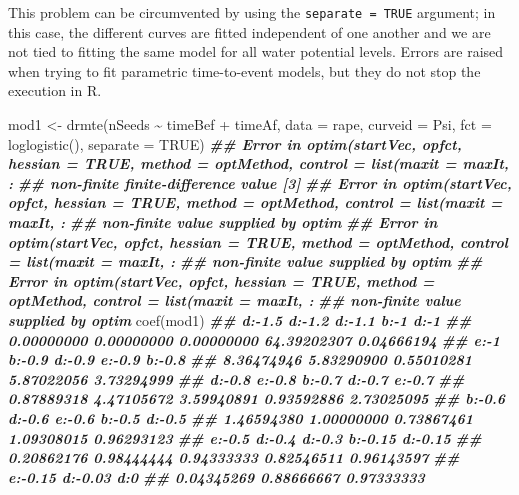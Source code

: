 \documentclass[
]{book}
\newenvironment{Shaded}{\begin{snugshade}}{\end{snugshade}}
\newcommand{\AttributeTok}[1]{\textcolor[rgb]{0.77,0.63,0.00}{#1}}
\newcommand{\ConstantTok}[1]{\textcolor[rgb]{0.00,0.00,0.00}{#1}}
\newcommand{\DocumentationTok}[1]{\textcolor[rgb]{0.56,0.35,0.01}{\textbf{\textit{#1}}}}
\newcommand{\FunctionTok}[1]{\textcolor[rgb]{0.00,0.00,0.00}{#1}}
\newcommand{\NormalTok}[1]{#1}
\newcommand{\OtherTok}[1]{\textcolor[rgb]{0.56,0.35,0.01}{#1}}
\newcommand{\SpecialCharTok}[1]{\textcolor[rgb]{0.00,0.00,0.00}{#1}}
\begin{document}
This problem can be circumvented by using the \texttt{separate\ =\ TRUE} argument; in this case, the different curves are fitted independent of one another and we are not tied to fitting the same model for all water potential levels. Errors are raised when trying to fit parametric time-to-event models, but they do not stop the execution in R.

\begin{Shaded}
\begin{Highlighting}[]
\NormalTok{mod1 }\OtherTok{\textless{}{-}} \FunctionTok{drmte}\NormalTok{(nSeeds }\SpecialCharTok{\textasciitilde{}}\NormalTok{ timeBef }\SpecialCharTok{+}\NormalTok{ timeAf, }\AttributeTok{data =}\NormalTok{ rape,}
             \AttributeTok{curveid =}\NormalTok{ Psi, }\AttributeTok{fct =} \FunctionTok{loglogistic}\NormalTok{(),}
             \AttributeTok{separate =} \ConstantTok{TRUE}\NormalTok{)}
\DocumentationTok{\#\# Error in optim(startVec, opfct, hessian = TRUE, method = optMethod, control = list(maxit = maxIt,  : }
\DocumentationTok{\#\#   non{-}finite finite{-}difference value [3]}
\DocumentationTok{\#\# Error in optim(startVec, opfct, hessian = TRUE, method = optMethod, control = list(maxit = maxIt,  : }
\DocumentationTok{\#\#   non{-}finite value supplied by optim}
\DocumentationTok{\#\# Error in optim(startVec, opfct, hessian = TRUE, method = optMethod, control = list(maxit = maxIt,  : }
\DocumentationTok{\#\#   non{-}finite value supplied by optim}
\DocumentationTok{\#\# Error in optim(startVec, opfct, hessian = TRUE, method = optMethod, control = list(maxit = maxIt,  : }
\DocumentationTok{\#\#   non{-}finite value supplied by optim}
\FunctionTok{coef}\NormalTok{(mod1)}
\DocumentationTok{\#\#      d:{-}1.5      d:{-}1.2      d:{-}1.1        b:{-}1        d:{-}1 }
\DocumentationTok{\#\#  0.00000000  0.00000000  0.00000000 64.39202307  0.04666194 }
\DocumentationTok{\#\#        e:{-}1      b:{-}0.9      d:{-}0.9      e:{-}0.9      b:{-}0.8 }
\DocumentationTok{\#\#  8.36474946  5.83290900  0.55010281  5.87022056  3.73294999 }
\DocumentationTok{\#\#      d:{-}0.8      e:{-}0.8      b:{-}0.7      d:{-}0.7      e:{-}0.7 }
\DocumentationTok{\#\#  0.87889318  4.47105672  3.59940891  0.93592886  2.73025095 }
\DocumentationTok{\#\#      b:{-}0.6      d:{-}0.6      e:{-}0.6      b:{-}0.5      d:{-}0.5 }
\DocumentationTok{\#\#  1.46594380  1.00000000  0.73867461  1.09308015  0.96293123 }
\DocumentationTok{\#\#      e:{-}0.5      d:{-}0.4      d:{-}0.3     b:{-}0.15     d:{-}0.15 }
\DocumentationTok{\#\#  0.20862176  0.98444444  0.94333333  0.82546511  0.96143597 }
\DocumentationTok{\#\#     e:{-}0.15     d:{-}0.03         d:0 }
\DocumentationTok{\#\#  0.04345269  0.88666667  0.97333333}
\end{Highlighting}
\end{Shaded}
\end{document}
